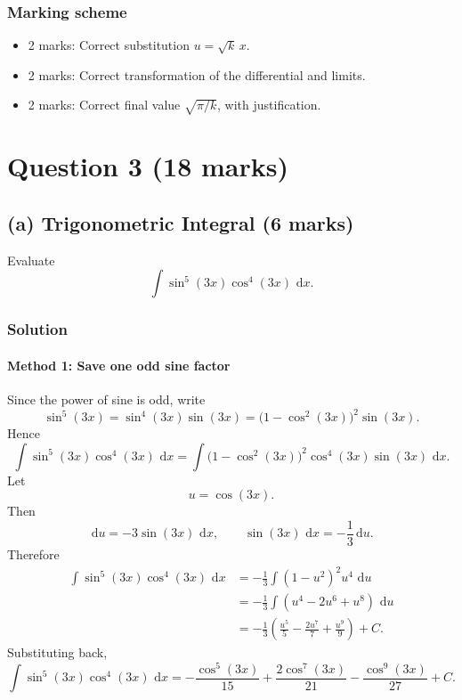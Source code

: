 \documentclass[12pt]{article}
\newcommand{\dd}{\,\mathrm{d}}
\begin{document}
\subsubsection{Marking scheme}
\begin{itemize}
\item 2 marks: Correct substitution \(u=\sqrt{k}\,x\).
\item 2 marks: Correct transformation of the differential and limits.
\item 2 marks: Correct final value \(\sqrt{\pi/k}\), with justification.
\end{itemize}

\newpage

\section{Question 3 \hfill (18 marks)}

\subsection{(a) Trigonometric Integral \hfill (6 marks)}

Evaluate
\[
\int \sin^5(3x)\cos^4(3x)\,\dd x.
\]

\subsubsection{Solution}
\paragraph{Method 1: Save one odd sine factor}
Since the power of sine is odd, write
\[
\sin^5(3x)=\sin^4(3x)\sin(3x)=\bigl(1-\cos^2(3x)\bigr)^2\sin(3x).
\]
Hence
\[
\int \sin^5(3x)\cos^4(3x)\,\dd x
=
\int \bigl(1-\cos^2(3x)\bigr)^2\cos^4(3x)\sin(3x)\,\dd x.
\]
Let
\[
u=\cos(3x).
\]
Then
\[
\dd u=-3\sin(3x)\,\dd x,
\qquad
\sin(3x)\,\dd x=-\frac{1}{3}\dd u.
\]
Therefore
\begin{align*}
\int \sin^5(3x)\cos^4(3x)\,\dd x
&=-\frac{1}{3}\int (1-u^2)^2u^4\,\dd u \\
&=-\frac{1}{3}\int (u^4-2u^6+u^8)\,\dd u \\
&=-\frac{1}{3}\left(\frac{u^5}{5}-\frac{2u^7}{7}+\frac{u^9}{9}\right)+C.
\end{align*}
Substituting back,
\[
\boxed{\int \sin^5(3x)\cos^4(3x)\,\dd x
=-\frac{\cos^5(3x)}{15}
+\frac{2\cos^7(3x)}{21}
-\frac{\cos^9(3x)}{27}+C.}
\]

\newpage
\end{document}
